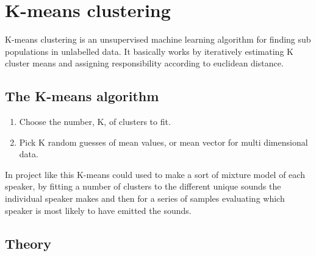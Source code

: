 \chapter{K-means clustering}
K-means clustering is an unsupervised machine learning algorithm for finding sub populations in unlabelled data.
It basically works by iteratively estimating K cluster means and assigning responsibility according to euclidean distance.

\section{The K-means algorithm}
\begin{enumerate}

\item
Choose the number, K, of clusters to fit.

\item
Pick K random guesses of mean values, or mean vector for multi dimensional data.


\end{enumerate}


In project like this K-means could used to make a sort of mixture model of each speaker, by fitting a number of clusters to the different unique sounds the individual speaker makes and then for a series of samples evaluating which speaker is most likely to have emitted the sounds.

\section{Theory}   